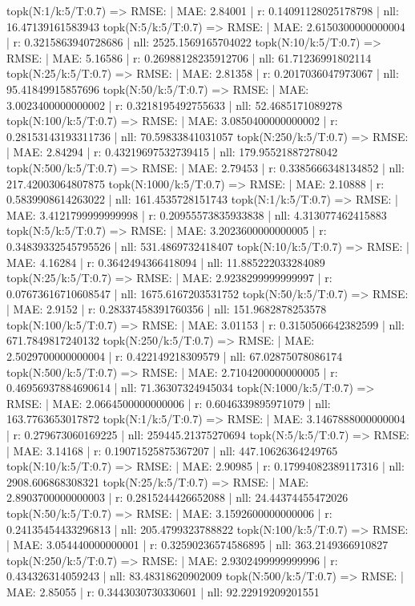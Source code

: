 topk(N:1/k:5/T:0.7) => RMSE: | MAE: 2.84001 | r: 0.14091128025178798 | nll: 16.47139161583943
topk(N:5/k:5/T:0.7) => RMSE: | MAE: 2.6150300000000004 | r: 0.3215863940728686 | nll: 2525.1569165704022
topk(N:10/k:5/T:0.7) => RMSE: | MAE: 5.16586 | r: 0.26988128235912706 | nll: 61.71236991802114
topk(N:25/k:5/T:0.7) => RMSE: | MAE: 2.81358 | r: 0.2017036047973067 | nll: 95.41849915857696
topk(N:50/k:5/T:0.7) => RMSE: | MAE: 3.0023400000000002 | r: 0.3218195492755633 | nll: 52.4685171089278
topk(N:100/k:5/T:0.7) => RMSE: | MAE: 3.0850400000000002 | r: 0.28153143193311736 | nll: 70.59833841031057
topk(N:250/k:5/T:0.7) => RMSE: | MAE: 2.84294 | r: 0.43219697532739415 | nll: 179.95521887278042
topk(N:500/k:5/T:0.7) => RMSE: | MAE: 2.79453 | r: 0.3385666348134852 | nll: 217.42003064807875
topk(N:1000/k:5/T:0.7) => RMSE: | MAE: 2.10888 | r: 0.5839908614263022 | nll: 161.4535728151743
topk(N:1/k:5/T:0.7) => RMSE: | MAE: 3.4121799999999998 | r: 0.20955573835933838 | nll: 4.313077462415883
topk(N:5/k:5/T:0.7) => RMSE: | MAE: 3.2023600000000005 | r: 0.34839332545795526 | nll: 531.4869732418407
topk(N:10/k:5/T:0.7) => RMSE: | MAE: 4.16284 | r: 0.3642494366418094 | nll: 11.885222033284089
topk(N:25/k:5/T:0.7) => RMSE: | MAE: 2.9238299999999997 | r: 0.07673616710608547 | nll: 1675.6167203531752
topk(N:50/k:5/T:0.7) => RMSE: | MAE: 2.9152 | r: 0.28337458391760356 | nll: 151.9682878253578
topk(N:100/k:5/T:0.7) => RMSE: | MAE: 3.01153 | r: 0.3150506642382599 | nll: 671.7849817240132
topk(N:250/k:5/T:0.7) => RMSE: | MAE: 2.5029700000000004 | r: 0.422149218309579 | nll: 67.02875078086174
topk(N:500/k:5/T:0.7) => RMSE: | MAE: 2.7104200000000005 | r: 0.46956937884690614 | nll: 71.36307324945034
topk(N:1000/k:5/T:0.7) => RMSE: | MAE: 2.0664500000000006 | r: 0.6046339895971079 | nll: 163.7763653017872
topk(N:1/k:5/T:0.7) => RMSE: | MAE: 3.1467888000000004 | r: 0.279673060169225 | nll: 259445.21375270694
topk(N:5/k:5/T:0.7) => RMSE: | MAE: 3.14168 | r: 0.19071525875367207 | nll: 447.10626364249765
topk(N:10/k:5/T:0.7) => RMSE: | MAE: 2.90985 | r: 0.17994082389117316 | nll: 2908.606868308321
topk(N:25/k:5/T:0.7) => RMSE: | MAE: 2.8903700000000003 | r: 0.2815244426652088 | nll: 24.44374455472026
topk(N:50/k:5/T:0.7) => RMSE: | MAE: 3.1592600000000006 | r: 0.24135454433296813 | nll: 205.4799323788822
topk(N:100/k:5/T:0.7) => RMSE: | MAE: 3.054440000000001 | r: 0.32590236574586895 | nll: 363.2149366910827
topk(N:250/k:5/T:0.7) => RMSE: | MAE: 2.9302499999999996 | r: 0.434326314059243 | nll: 83.48318620902009
topk(N:500/k:5/T:0.7) => RMSE: | MAE: 2.85055 | r: 0.3443030730330601 | nll: 92.22919209201551
